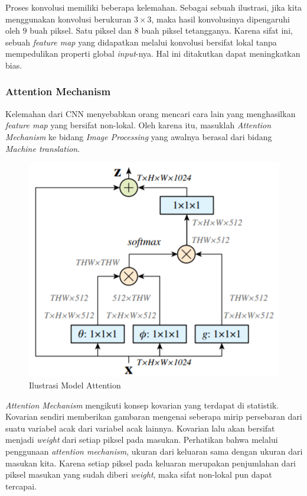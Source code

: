 \documentclass[11pt, a4paper, final]{report}
\begin{document}
Proses konvolusi memiliki beberapa kelemahan. Sebagai sebuah ilustrasi, jika kita menggunakan konvolusi berukuran $3 \times 3$, maka hasil konvolusinya dipengaruhi oleh $9$ buah piksel. Satu piksel dan 8 buah piksel tetangganya. Karena sifat ini, sebuah \textit{feature map} yang didapatkan melalui konvolusi bersifat lokal tanpa mempedulikan properti global \textit{input}-nya. Hal ini ditakutkan dapat meningkatkan bias.

\subsubsection{Attention Mechanism}

Kelemahan dari CNN menyebabkan orang mencari cara lain yang menghasilkan \textit{feature map} yang bersifat non-lokal. Oleh karena itu, masuklah \textit{Attention Mechanism} ke bidang \textit{Image Processing} yang awalnya berasal dari bidang \textit{Machine translation}. 

\begin{figure}[H]
\centering
\includegraphics[scale=0.25]{assets/AttentionModel.png}
\caption{Ilustrasi Model Attention \cite{wang2018nonlocal}}
\end{figure}

\textit{Attention Mechanism} mengikuti konsep kovarian yang terdapat di statistik. Kovarian sendiri memberikan gambaran mengenai seberapa mirip persebaran dari suatu variabel acak dari variabel acak lainnya. Kovarian lalu akan bersifat menjadi \textit{weight} dari setiap piksel pada masukan. Perhatikan bahwa melalui penggunaan \textit{attention mechanism}, ukuran dari keluaran sama dengan ukuran dari masukan kita. Karena setiap piksel pada keluaran merupakan penjumlahan dari piksel masukan yang sudah diberi \textit{weight}, maka sifat non-lokal pun dapat tercapai.
\end{document}
